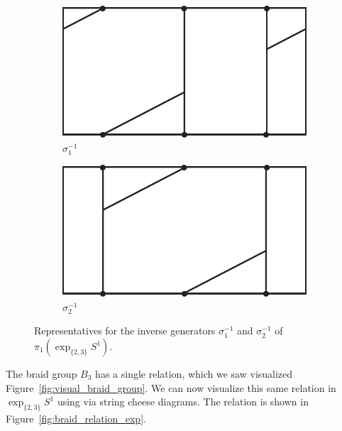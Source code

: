 \documentclass[12pt,twoside]{reedthesis}
\theoremstyle{definition}
\newcommand{\exptwothree}{\exp_{\{2,3\}}}
\begin{document}
\begin{figure}[h]
  \centering
  \begin{subfigure}[t]{0.23\textwidth}
    \centering
    \includegraphics[width=\textwidth]{figures/braid_gen_a_inv.pdf}
    \caption{$\sigma_1^{-1}$}
  \end{subfigure}
  \hspace{5mm}
  \begin{subfigure}[t]{0.23\textwidth}
    \centering
    \includegraphics[width=\textwidth]{figures/braid_gen_b_inv.pdf}
    \caption{$\sigma_2^{-1}$}
  \end{subfigure}
  \caption{Representatives for the inverse generators $\sigma_1^{-1}$ and $\sigma_2^{-1}$ of $\pi_1(\exptwothree S^1)$.}
  \label{fig:braid_gen_invs_exp}
\end{figure}

The braid group $B_3$ has a single relation, which we saw visualized Figure~\ref{fig:visual_braid_group}.
We can now visualize this same relation in $\exptwothree S^1$ using via string cheese diagrams.
The relation is shown in Figure~\ref{fig:braid_relation_exp}.
\end{document}
